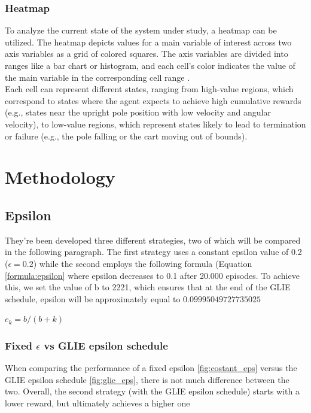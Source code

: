\documentclass{article}
\begin{document}
\subsubsection{Heatmap}
To analyze the current state of the system under study, a heatmap can be utilized. The heatmap depicts values for a main variable of interest across two axis variables as a grid of colored squares. The axis variables are divided into ranges like a bar chart or histogram, and each cell’s color indicates the value of the main variable in the corresponding cell range \cite{heatmap}. \\ 

Each cell can represent different states, ranging from high-value regions, which correspond to states where the agent expects to achieve high cumulative rewards (e.g., states near the upright pole position with low velocity and angular velocity), to low-value regions, which represent states likely to lead to termination or failure (e.g., the pole falling or the cart moving out of bounds).


\section{Methodology}

\subsection{Epsilon}
They're been developed three different strategies, two of which will be compared in the following paragraph. The first strategy uses a constant epsilon value of 0.2  ($\epsilon =  0.2$) while the second employs the following formula (Equation \ref{formula:epsilon} where epsilon decreases to 0.1 after 20.000 episodes. To achieve this, we set the value of b to 2221, which ensures that at the end of the GLIE schedule, epsilon will be approximately equal to $0.09995049727735025$

\centering
\label{formula:epsilon}
$ e_k = b / (b+k) $ 

\flushleft

\subsubsection{Fixed $\epsilon$ vs GLIE epsilon schedule}
When comparing the performance of a fixed epsilon \ref{fig:costant_eps} versus the GLIE epsilon schedule \ref{fig:glie_eps}, there is not much difference between the two. Overall, the second strategy (with the GLIE epsilon schedule) starts with a lower reward, but ultimately achieves a higher one
\end{document}
